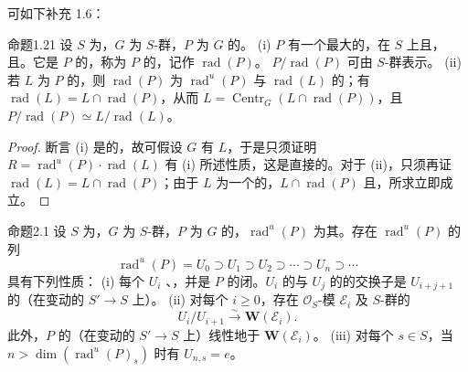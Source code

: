 可如下补充 1.6：
\begin{SGAresult}{命题}{1.21}
设 $S$ 为，$G$ 为 $S$-群，$P$ 为 $G$ 的。
(i) $P$ 有一个最大的，在 $S$ 上且，且。它是 $P$ 的，称为 $P$ 的，记作 $\operatorname{rad}(P)$。 $P/\operatorname{rad}(P)$ 可由 $S$-群表示。
(ii) 若 $L$ 为 $P$ 的，则 $\operatorname{rad}(P)$ 为 $\operatorname{rad}^{u}(P)$ 与 $\operatorname{rad}(L)$ 的；有 $\operatorname{rad}(L)=L\cap\operatorname{rad}(P)$，从而 $L=\operatorname{Centr}_G(L\cap\operatorname{rad}(P))$，且 $P/\operatorname{rad}(P)\simeq L/\operatorname{rad}(L)$。
\end{SGAresult}
\begin{proof}
断言 (i) 是的，故可假设 $G$ 有 $L$，于是只须证明 $R=\operatorname{rad}^{u}(P)\cdot\operatorname{rad}(L)$ 有 (i) 所述性质，这是直接的。对于 (ii)，只须再证 $\operatorname{rad}(L)=L\cap\operatorname{rad}(P)$；由于 $L$ 为一个的，$L\cap\operatorname{rad}(P)$ 且，所求立即成立。
\end{proof}
\begin{SGAresult}{命题}{2.1}
设 $S$ 为，$G$ 为 $S$-群，$P$ 为 $G$ 的，$\operatorname{rad}^{u}(P)$ 为其。存在 $\operatorname{rad}^{u}(P)$ 的列
\[\operatorname{rad}^{u}(P)=U_0\supset U_1\supset U_2\supset\cdots\supset U_n\supset\cdots\]
具有下列性质：
(i) 每个 $U_i$ 、，并是 $P$ 的闭。$U_i$ 的与 $U_j$ 的的交换子是 $U_{i+j+1}$ 的（在变动的 $S'\to S$ 上）。
(ii) 对每个 $i\ge0$，存在 $\mathcal O_S$-模 $\mathcal E_i$ 及 $S$-群的
\[U_i/U_{i+1}\xrightarrow{\sim}\mathbf W(\mathcal E_i).\]
此外，$P$ 的（在变动的 $S'\to S$ 上）线性地于 $\mathbf W(\mathcal E_i)$。
(iii) 对每个 $s\in S$，当 $n>\dim(\operatorname{rad}^{u}(P)_s)$ 时有 $U_{n,s}=e$。
\end{SGAresult}
